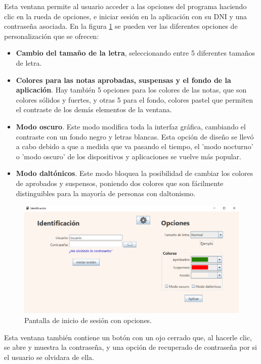 Esta ventana permite al usuario acceder a las opciones del programa haciendo clic en la rueda de opciones, e iniciar sesión en la aplicación con su DNI y una contraseña asociada. En la figura \ref{Fig:loginopciones} se pueden ver las diferentes opciones de personalización que se ofrecen:
\begin{itemize}
	\item \textbf{Cambio del tamaño de la letra}, seleccionando entre 5 diferentes tamaños de letra.
	\item \textbf{Colores para las notas aprobadas, suspensas y el fondo de la aplicación}. Hay también 5 opciones para los colores de las notas, que son colores sólidos y fuertes, y otras 5 para el fondo, colores pastel que permiten el contraste de los demás elementos de la ventana.
	\item \textbf{Modo oscuro}. Este modo modifica toda la interfaz gráfica, cambiando el contraste con un fondo negro y letras blancas. Esta opción de diseño se llevó a cabo debido a que a medida que va pasando el tiempo, el 'modo nocturno' o 'modo oscuro' de los dispositivos y aplicaciones se vuelve más popular.
	\item \textbf{Modo daltónicos}. Este modo bloquea la posibilidad de cambiar los colores de aprobados y suspensos, poniendo dos colores que son fácilmente distinguibles para la mayoría de personas con daltonismo.
\end{itemize}

\begin{figure}[h]
\centering\includegraphics[width=1\linewidth]{figs/loginopciones.png}
\caption{Pantalla de inicio de sesión con opciones.}
\label{Fig:loginopciones}
\end{figure}

Esta ventana también contiene un botón con un ojo cerrado que, al hacerle clic, se abre y muestra la contraseña, y una opción de recuperado de contraseña por si el usuario se olvidara de ella.


